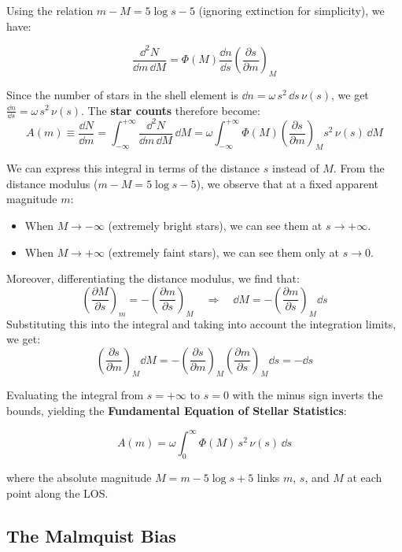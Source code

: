 \medskip

Using the relation $m - M = 5\log s - 5$ (ignoring extinction for simplicity), we have:

$$
\frac{\dd^2 N}{\dd{m}\,\dd{M}} = \Phi(M)\dfrac{\dd{n}}{\dd{s}}\left(\dfrac{\partial s}{\partial m}\right)_M
$$

Since the number of stars in the shell element is $\dd{n} = \omega\,s^2\,\dd{s}\,\nu(s)$, we get $\frac{\dd{n}}{\dd{s}} = \omega\,s^2\,\nu(s)$.
The \textbf{star counts} therefore become:
$$
A(m) \equiv \frac{\dd{N}}{\dd{m}} = \int_{-\infty}^{+\infty} \frac{\dd^2 N}{\dd{m}\,\dd{M}}\,\dd{M} = \omega\int_{-\infty}^{+\infty} \Phi(M)\left(\frac{\partial s}{\partial m}\right)_M s^2\,\nu(s)\,\dd{M}
$$

We can express this integral in terms of the distance $s$ instead of $M$. From the distance modulus ($m - M = 5 \log s - 5$), we observe that at a fixed apparent magnitude $m$:
\begin{itemize}[noitemsep]
    \item When $M \to -\infty$ (extremely bright stars), we can see them at $s \to +\infty$.
    \item When $M \to +\infty$ (extremely faint stars), we can see them only at $s \to 0$.
\end{itemize}

Moreover, differentiating the distance modulus, we find that:
$$
\left(\frac{\partial M}{\partial s}\right)_m = -\left(\frac{\partial m}{\partial s}\right)_M \quad \Longrightarrow \quad \dd{M} = -\left(\frac{\partial m}{\partial s}\right)_M \dd{s}
$$
Substituting this into the integral and taking into account the integration limits, we get:
$$
\left(\frac{\partial s}{\partial m}\right)_M \dd{M} = -\left(\frac{\partial s}{\partial m}\right)_M \left(\frac{\partial m}{\partial s}\right)_M \dd{s} = -\dd{s}
$$

Evaluating the integral from $s = +\infty$ to $s = 0$ with the minus sign inverts the bounds, yielding the \textbf{Fundamental Equation of Stellar Statistics}:

$$
\boxed{
    A(m) = \omega \int_0^{\infty} \Phi(M)\,s^2\,\nu(s)\,\dd{s}
}
$$

where the absolute magnitude $M = m - 5\log s + 5$ links $m$, $s$, and $M$ at each point along the LOS.

\subsection{The Malmquist Bias}

